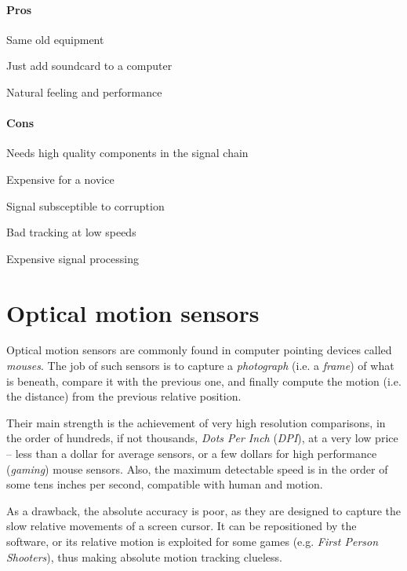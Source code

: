 \documentclass[a4paper,10pt]{article}
\begin{document}
\begin{multicols}{2}
\paragraph{Pros}
\begin{itemize*}
	\item Same old equipment
	\item Just add soundcard to a computer
	\item Natural feeling and performance
\end{itemize*}


\paragraph{Cons}
\begin{itemize*}
	\item Needs high quality components in the signal chain
	\item Expensive for a novice
	\item Signal subsceptible to corruption
	\item Bad tracking at low speeds
	\item Expensive signal processing
\end{itemize*}


\section{Optical motion sensors}
\label{sec:mouse_sensors}

Optical motion sensors are commonly found in computer pointing devices called
\emph{mouses}. The job of such sensors is to capture a \emph{photograph}
(i.e. a \emph{frame}) of what is beneath, compare it with the previous one,
and finally compute the motion (i.e. the distance) from the previous relative
position.

Their main strength is the achievement of very high resolution comparisons, in
the order of hundreds, if not thousands, \emph{Dots Per Inch} (\emph{DPI}), at
a very low price -- less than a dollar for average sensors, or a few dollars
for high performance (\emph{gaming}) mouse sensors. Also, the maximum
detectable speed is in the order of some tens inches per second, compatible
with human and motion.

As a drawback, the absolute accuracy is poor, as they are designed to capture
the slow relative movements of a screen cursor. It can be repositioned by
the software, or its relative motion is exploited for some games (e.g.
\emph{First Person Shooters}), thus making absolute motion tracking clueless.


\end{multicols}
\end{document}
